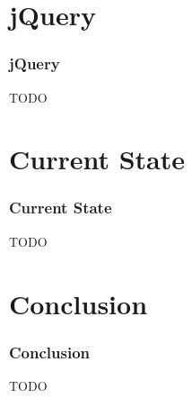 \documentclass{beamer}
\begin{document}
\section{jQuery}
\begin{frame}
  \frametitle{jQuery}
  TODO
\end{frame}

\section{Current State}
\begin{frame}
  \frametitle{Current State}
  TODO
\end{frame}

\section{Conclusion}
\begin{frame}
  \frametitle{Conclusion}
  TODO
\end{frame}
\end{document}
